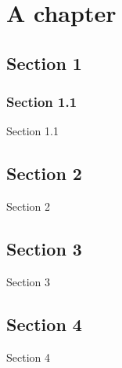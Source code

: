 \documentclass[oneside]{memoir}
\begin{document}
\chapter{A chapter}
\startcontents[chapters]
\section{Section 1}
\subsection{Section 1.1}
Section 1.1
\section{Section 2}
Section 2
\section{Section 3}
Section 3
\section{Section 4}
Section 4
\end{document}
